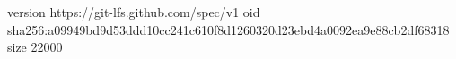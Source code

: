 version https://git-lfs.github.com/spec/v1
oid sha256:a09949bd9d53ddd10cc241c610f8d1260320d23ebd4a0092ea9e88cb2df68318
size 22000
